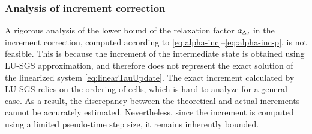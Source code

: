 
\subsubsection{Analysis of increment correction}

A rigorous analysis of the lower bound of the relaxation factor $\alpha_{\mathrm\Delta,i}$ in the increment correction, computed according to \eqref{eq:alpha-inc}–\eqref{eq:alpha-inc-p}, is not feasible. 
This is because the increment of the intermediate state is obtained using LU-SGS approximation, and therefore does not represent the exact solution of the linearized system \eqref{eq:linearTauUpdate}. 
The exact increment calculated by LU-SGS relies on 
the ordering of cells, which is hard to analyze 
for a general case.
As a result, the discrepancy between the theoretical and actual increments cannot be accurately estimated. 
Nevertheless, since the increment is computed using a limited pseudo-time step size, it remains inherently bounded. 

